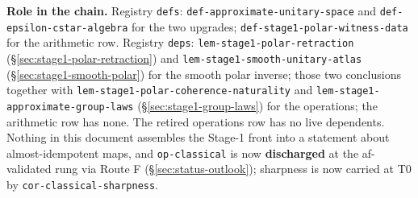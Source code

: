 \noindent\textbf{Role in the chain.} Registry \texttt{defs}:
\texttt{def-approximate-unitary-space} and \texttt{def-epsilon-cstar-algebra} for the two
upgrades; \texttt{def-stage1-polar-witness-data} for the arithmetic row. Registry
\texttt{deps}: \texttt{lem-stage1-polar-retraction}
(\S\ref{sec:stage1-polar-retraction}) and \texttt{lem-stage1-smooth-unitary-atlas}
(\S\ref{sec:stage1-smooth-polar}) for the smooth polar inverse; those two conclusions
together with \texttt{lem-stage1-polar-coherence-naturality} and
\texttt{lem-stage1-approximate-group-laws} (\S\ref{sec:stage1-group-laws}) for the
operations; the arithmetic row has none. The retired operations row has no live dependents.
Nothing in this document assembles the Stage-1 front into a statement about
almost-idempotent maps, and \texttt{op-classical} is now \textbf{discharged} at the af-validated rung via Route F (\S\ref{sec:status-outlook}); sharpness is now carried at T0 by \texttt{cor-classical-sharpness}.
